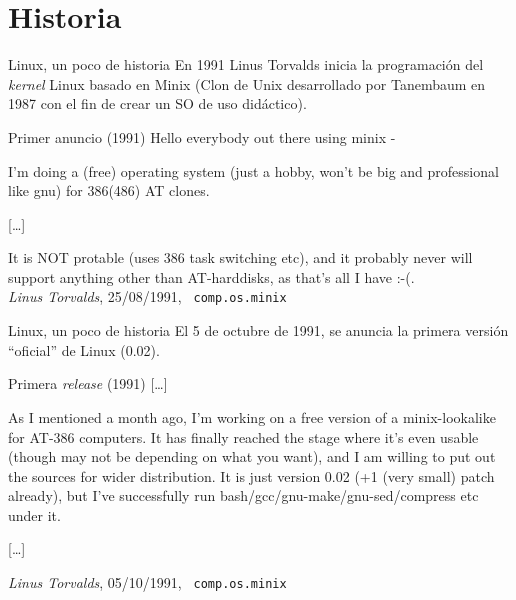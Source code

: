 \section{Historia}
\begin{frame}{Linux, un poco de historia}
  En 1991 Linus Torvalds inicia la programación del \textit{kernel} Linux
  basado en Minix\cite{Minix} (Clon de Unix desarrollado por Tanembaum en
  1987 con el fin de crear un SO de uso didáctico).

\begin{block}{\alert{Primer anuncio} \hfill (1991)}\small
  \noindent Hello everybody out there using minix - 
 
  I’m doing a (free) operating system (just a hobby, won’t be big and
  professional like gnu) for 386(486) AT clones.

  [\ldots]
  
  It is \alert{NOT protable} (uses 386 task switching etc), and it probably never
  will support anything other than AT-harddisks, as that’s all I have :-(.\\
  
  \hfill \emph{Linus Torvalds}, 25/08/1991, \texttt{\small
    comp.os.minix\cite{Torvalds1992}}
\end{block}

\end{frame}

\begin{frame}{Linux, un poco de historia}
El 5 de octubre de 1991, se anuncia la primera versión ``oficial'' de
Linux (0.02).

\begin{block}{\alert{Primera \textit{release}} \hfill (1991)}
  [\ldots]

  As I mentioned a month ago, I'm working on a free version of a
  minix-lookalike for AT-386 computers. It has finally reached the stage
  where it's even usable (though may not be depending on what you want),
  and I am willing to put out the sources for wider distribution. It is
  just version 0.02 (+1 (very small) patch already), but I've successfully
  run bash/gcc/gnu-make/gnu-sed/compress etc under it.

  [\ldots]

  \hfill \emph{Linus Torvalds}, 05/10/1991, \texttt{\small
    comp.os.minix\cite{Torvalds1992}}

\end{block}
\end{frame}

